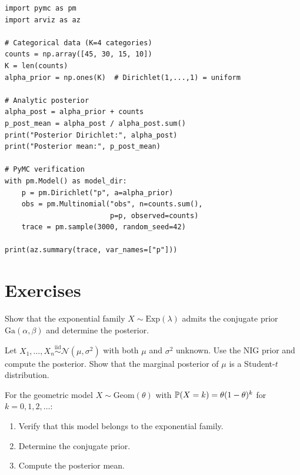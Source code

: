\begin{codeblock}[title=\textbf{Multinomial--Dirichlet conjugacy}]
\begin{verbatim}
import pymc as pm
import arviz as az

# Categorical data (K=4 categories)
counts = np.array([45, 30, 15, 10])
K = len(counts)
alpha_prior = np.ones(K)  # Dirichlet(1,...,1) = uniform

# Analytic posterior
alpha_post = alpha_prior + counts
p_post_mean = alpha_post / alpha_post.sum()
print("Posterior Dirichlet:", alpha_post)
print("Posterior mean:", p_post_mean)

# PyMC verification
with pm.Model() as model_dir:
    p = pm.Dirichlet("p", a=alpha_prior)
    obs = pm.Multinomial("obs", n=counts.sum(),
                         p=p, observed=counts)
    trace = pm.sample(3000, random_seed=42)

print(az.summary(trace, var_names=["p"]))
\end{verbatim}
\end{codeblock}

\section{Exercises}

\begin{exercise}
Show that the exponential family $X \sim \text{Exp}(\lambda)$ admits the
conjugate prior $\text{Ga}(\alpha, \beta)$ and determine the posterior.
\end{exercise}

\begin{exercise}
Let $X_1, \ldots, X_n \overset{\text{iid}}{\sim} \mathcal{N}(\mu, \sigma^2)$
with both $\mu$ and $\sigma^2$ unknown. Use the NIG prior and compute
the posterior. Show that the marginal posterior of $\mu$ is a Student-$t$
distribution.
\end{exercise}

\begin{exercise}
For the geometric model $X \sim \text{Geom}(\theta)$ with
$\mathbb{P}(X = k) = \theta(1-\theta)^k$ for $k = 0, 1, 2, \ldots$:
\begin{enumerate}
  \item Verify that this model belongs to the exponential family.
  \item Determine the conjugate prior.
  \item Compute the posterior mean.
\end{enumerate}
\end{exercise}

